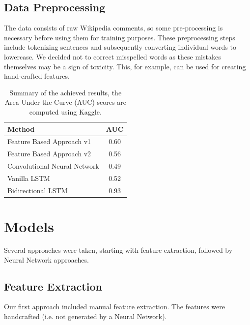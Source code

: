 \documentclass[10pt, a4paper]{article}
\begin{document}
\begin{multicols}{2}
		\subsection*{Data Preprocessing}
		The data consists of raw Wikipedia comments, so some pre-processing is necessary before using them for training purposes. These preprocessing steps include tokenizing sentences and subsequently converting individual words to lowercase. We decided not to correct misspelled words as these mistakes themselves may be a sign of toxicity. This, for example, can be used for creating hand-crafted features. 
		
		\begin{table}[t]
			\centering
			\begin{tabular}{l|c}
				\toprule
				\textbf{Method} & \textbf{AUC} \\
				\midrule
				Feature Based Approach v1 & 0.60   \\
				Feature Based Approach v2 & 0.56 \\
				Convolutional Neural Network & 0.49 \\
				Vanilla LSTM & 0.52 \\
				Bidirectional LSTM & 0.93 \\
				\bottomrule
			\end{tabular}
			\caption{Summary of the achieved results, the Area Under the Curve (AUC) scores are computed using Kaggle.}
			\label{table:summary_results}
		\end{table}
		
		
		\section{Models}
		Several approaches were taken, starting with feature extraction, followed by Neural Network approaches.
		
		\subsection{Feature Extraction}
		Our first approach included manual feature extraction. The features were handcrafted (i.e. not generated by a Neural Network).

\end{multicols}
\end{document}
